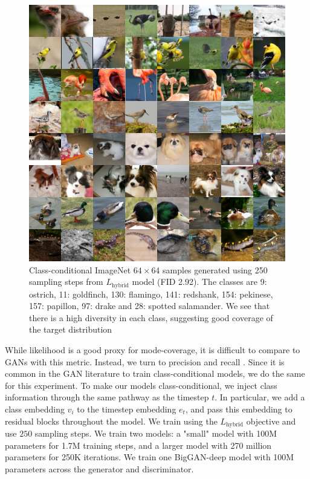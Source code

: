 \documentclass{article}
\begin{document}
\begin{figure}[t]
\begin{center}
\centerline{\includegraphics[width=0.8\columnwidth]{samples_classcond_imgnet_fid3p7_grid.png}}
\caption{\label{fig:classcond} Class-conditional ImageNet $64 \times 64$ samples generated using 250 sampling steps from $L_{\text{hybrid}}$ model (FID 2.92). The classes are 9: ostrich, 11: goldfinch, 130: flamingo, 141: redshank, 154: pekinese, 157: papillon, 97: drake and 28: spotted salamander. We see that there is a high diversity in each class, suggesting good coverage of the target distribution}
\end{center}
\vskip -0.2in
\end{figure}

While likelihood is a good proxy for mode-coverage, it is difficult to compare to GANs with this metric. Instead, we turn to precision and recall \citep{improvedpr}. Since it is common in the GAN literature to train class-conditional models, we do the same for this experiment. To make our models class-conditional, we inject class information through the same pathway as the timestep $t$. In particular, we add a class embedding $v_i$ to the timestep embedding $e_t$, and pass this embedding to residual blocks throughout the model. We train using the $L_{\text{hybrid}}$ objective and use $250$ sampling steps. We train two models: a "small" model with 100M parameters for 1.7M training steps, and a larger model with 270 million parameters for 250K iterations. We train one BigGAN-deep model with 100M parameters across the generator and discriminator.
\end{document}

